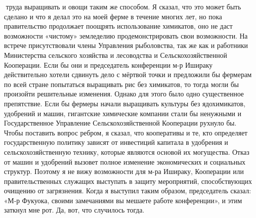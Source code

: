 \documentclass[a4paper]{book}
\begin{document}
труда выращивать и овощи таким же способом. Я сказал, что это может быть сделано и что я
делал это на моей ферме в течение многих лет, но пока правительство продолжает поощрять
использование химикатов, оно не даст возможности «чистому» земледелию
продемонстрировать свои возможности.
На встрече присутствовали члены Управления рыболовства, так же как и работники
Министерства сельского хозяйства и лесоводства и Сельскохозяйственной Кооперации. Если
бы они и председатель конференции м-р Ишираку действительно хотели сдвинуть дело с
мёртвой точки и предложили бы фермерам по всей стране попытаться выращивать рис без
химикатов, то тогда могли бы произойти решительные изменения.
Однако для этого было одно существенное препятствие. Если бы фермеры начали
выращивать культуры без ядохимикатов, удобрений и машин, гигантские химические
компании стали бы ненужными и Государственное Управление Сельскохозяйственной
Кооперации рухнуло бы.
Чтобы поставить вопрос ребром, я сказал, что кооперативы и те, кто определяет
государственную политику зависят от инвестиций капитала в удобрения и
сельскохозяйственную технику, которые являются основой их могущества. Отказ от машин и
удобрений вызовет полное изменение экономических и социальных структур. Поэтому я не
вижу возможности для м-ра Ишираку, Кооперации или правительственных служащих
выступать в защиту мероприятий, способствующих очищению от загрязнения.
Когда я выступил таким образом, председатель сказал: «М‑р Фукуока, своими
замечаниями вы мешаете работе конференции», и этим заткнул мне рот. Да, вот, что
случилось тогда.
\end{document}
